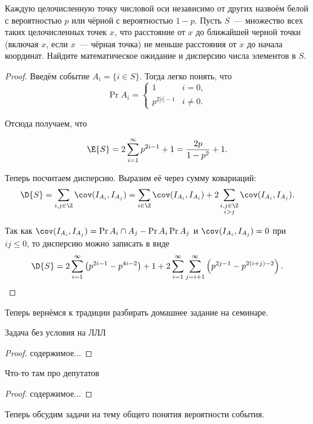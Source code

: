 \begin{problem}
    Каждую целочисленную точку числовой оси независимо от других назвоём белой с вероятностью \(p\) или чёрной с вероятностью \(1 - p\). Пусть \(S\)~--- множество всех таких целочисленных точек \(x\), что расстояние от \(x\) до ближайшей черной точки (включая \(x\), если \(x\)~--- чёрная точка) не меньше расстояния от \(x\) до начала координат. Найдите математическое ожидание и дисперсию числа элементов в \(S\).
\end{problem}
\begin{proof}
    Введём событие \(A_i = \{i \in S\}\). Тогда легко понять, что
    \[\Pr{A_i} = \begin{cases}
    1& i = 0, \\
    p^{2|i| - 1}& i \neq 0.
    \end{cases}\]
    
    Отсюда получаем, что
    
    \[\E{S} = 2\sum_{i = 1}^{\infty} p^{2i - 1} + 1 = \frac{2p}{1 - p^2} + 1.\]
    
    Теперь посчитаем дисперсию. Выразим её через сумму ковариаций:
    \[\D{S} = \sum_{i, j \in \Z} \cov(I_{A_i}, I_{A_j}) = \sum_{i \in \Z} \cov(I_{A_i}, I_{A_i}) + 2\sum_{\substack{i, j \in \Z \\ i > j}} \cov(I_{A_i}, I_{A_j}).\]
    
    Так как \(\cov(I_{A_i}, I_{A_j}) = \Pr{A_i \cap A_j} - \Pr{A_i}\Pr{A_j}\) и \(\cov(I_{A_i}, I_{A_j}) = 0\) при \(ij \leq 0\), то дисперсию можно записать в виде
    \[\D{S} = 2\sum_{i = 1}^{\infty}\left(p^{2i - 1} - p^{4i - 2}\right) + 1 + 2\sum_{i = 1}^{\infty}\sum_{j = i + 1}^{\infty}\left(p^{2j - 1} - p^{2(i + j) - 2}\right).\qedhere\]
\end{proof}

Теперь вернёмся к традиции разбирать домашнее задание на семинаре.

\begin{problem}
    Задача без условия на ЛЛЛ
\end{problem}
\begin{proof}
    содержимое...
\end{proof}

\begin{problem}
    Что-то там про депутатов
\end{problem}
\begin{proof}
    содержимое...
\end{proof}

Теперь обсудим задачи на тему общего понятия вероятности события.

